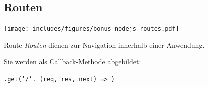 \subsection{Routen}

\begin{center}
    \texttt{[image: includes/figures/bonus\_nodejs\_routes.pdf]}
\end{center}

\begin{defi}{Route}
    \emph{Routen} dienen zur Navigation innerhalb einer Anwendung.

    Sie werden als Callback-Methode abgebildet:

    \begin{center}
        \texttt{.get('/'. (req, res, next) => {})}
    \end{center}


\end{defi}

